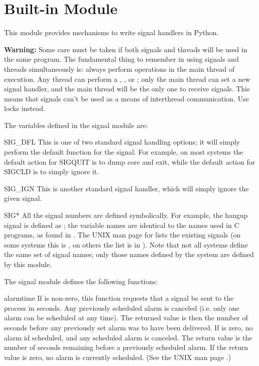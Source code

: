 \section{Built-in Module }

This module provides mechanisms to write signal handlers in Python.

{\bf Warning:} Some care must be taken if both signals and threads
will be used in the same program.  The fundamental thing to remember
in using signals and threads simultaneously is: always perform
 operations in the main thread of execution.  Any
thread can perform a , , or
; only the main thread can set a new signal handler, and
the main thread will be the only one to receive signals.  This means
that signals can't be used as a means of interthread communication.
Use locks instead.

The variables defined in the signal module are:

\renewcommand{\indexsubitem}{(in module signal)}
\begin{datadesc}{SIG_DFL}
  This is one of two standard signal handling options; it will simply
  perform the default function for the signal.  For example, on most
  systems the default action for SIGQUIT is to dump core and exit,
  while the default action for SIGCLD is to simply ignore it.
\end{datadesc}

\begin{datadesc}{SIG_IGN}
  This is another standard signal handler, which will simply ignore
  the given signal.
\end{datadesc}

\begin{datadesc}{SIG*}
  All the signal numbers are defined symbolically.  For example, the
  hangup signal is defined as ; the variable names
  are identical to the names used in C programs, as found in
  .
  The UNIX man page for  lists the existing signals (on
  some systems this is , on others the list is in
  ).
  Note that not all systems define the same set of signal names; only
  those names defined by the system are defined by this module.
\end{datadesc}

The signal module defines the following functions:

\begin{funcdesc}{alarm}{time}
  If  is non-zero, this function requests that a
   signal be sent to the process in  seconds.
  Any previously scheduled alarm is canceled (i.e. only one alarm can
  be scheduled at any time).  The returned value is then the number of
  seconds before any previously set alarm was to have been delivered.
  If  is zero, no alarm id scheduled, and any scheduled
  alarm is canceled.  The return value is the number of seconds
  remaining before a previously scheduled alarm.  If the return value
  is zero, no alarm is currently scheduled.  (See the UNIX man page
  .)
\end{funcdesc}

